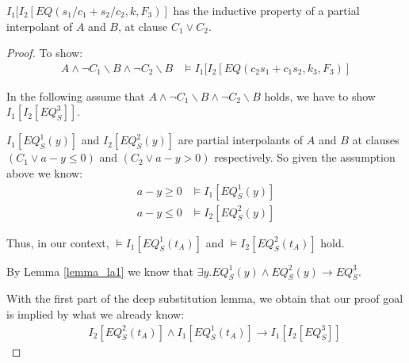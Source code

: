 \documentclass{llncs}
\begin{document}
\begin{theorem}
$I_1[I_2[EQ(s_1/c_1 + s_2/c_2, k, F_3)]$ has the inductive property of a partial interpolant
of $A$ and $B$, at clause $C_1 \vee C_2$. 
\end{theorem}
\begin{proof}
To show:
\begin{align*}
A\wedge\neg C_{1}\backslash B\wedge\neg C_{2}\backslash B 
& \models I_1[I_2[EQ(c_2 s_1 + c_1 s_2, k_3, F_3)] \label{eq:15}
\end{align*}

In the following assume that $A\wedge\neg C_{1}\backslash B\wedge\neg C_{2}\backslash B$ holds,
we have to show $I_1[I_2[EQ_S^3]]$.

$I_1[EQ_S^1(y)]$ and $I_2[EQ_S^2(y)]$ are partial interpolants of $A$ and $B$ at clauses
$(C_1 \vee a - y \leq 0)$ and $(C_2 \vee a - y > 0)$ respectively. So given the assumption above
we know:
\begin{align*}
a - y \geq 0 & \models I_1[EQ_S^1(y)] \\
a - y \leq 0 & \models I_2[EQ_S^2(y)]
\end{align*}

Thus, in our context, $\models I_1[EQ_S^1(t_A)]$ and $\models I_2[EQ_S^2(t_A)]$ hold.

By Lemma \ref{lemma_la1} we know that $\exists y. EQ_S^1(y) \wedge EQ_S^2(y) \rightarrow EQ_S^3$.

With the first part of the deep substitution lemma, we obtain that our proof goal is implied by what we already know:
\begin{align*}
  &  & I_{2}\left[EQ_S^2\left(t_{A}\right)\right]\wedge I_{1}\left[EQ_S^1\left(t_{A}\right)\right]\rightarrow I_{1}\left[I_{2}\left[EQ_S^3\right]\right]
\end{align*}

\end{proof}
\end{document}

